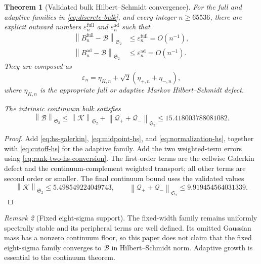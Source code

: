 \documentclass[11pt]{article}
\newtheorem{theorem}{Theorem}[section]
\theoremstyle{definition}
\theoremstyle{remark}
\newtheorem{remark}[theorem]{Remark}
\newcommand{\cK}{\mathcal K}
\newcommand{\cB}{\mathcal B}
\newcommand{\cQ}{\mathcal Q}
\newcommand{\norm}[1]{\left\lVert #1\right\rVert}
\begin{document}
\begin{theorem}[Validated bulk Hilbert--Schmidt convergence]
\label{thm:bulk-hs}
For the full and adaptive families in \eqref{eq:discrete-bulk}, and every
integer $n\ge65536$, there are explicit outward numbers
$\varepsilon_n^{\mathrm{full}}$ and
$\varepsilon_n^{\mathrm{ad}}$ such that
\begin{align}
 \norm{B_n^{\mathrm{full}}-\cB}_{\mathfrak S_2}
 &\le\varepsilon_n^{\mathrm{full}}=O(n^{-1}),
 \label{eq:full-hs-rate}\\
 \norm{B_n^{\mathrm{ad}}-\cB}_{\mathfrak S_2}
 &\le\varepsilon_n^{\mathrm{ad}}=O(n^{-1}).
 \label{eq:adaptive-hs-rate}
\end{align}
They are composed as
\begin{equation}
 \varepsilon_n
 =\eta_{K,n}+\sqrt2(\eta_{+,n}+\eta_{-,n}),
 \label{eq:bulk-ledger-composition}
\end{equation}
where $\eta_{K,n}$ is the appropriate full or adaptive Markov
Hilbert--Schmidt defect.

The intrinsic continuum bulk satisfies
\begin{equation}
 \norm{\cB}_{\mathfrak S_2}
 \le \norm{\cK}_{\mathfrak S_2}
     +\norm{\cQ_++\cQ_-}_{\mathfrak S_2}
 \le15.418003788081082.
 \label{eq:bulk-hs-upper}
\end{equation}
\end{theorem}

\begin{proof}
Add \eqref{eq:hs-galerkin}, \eqref{eq:midpoint-hs}, and
\eqref{eq:normalization-hs}, together with \eqref{eq:cutoff-hs} for the
adaptive family.  Add the two weighted-term errors using
\eqref{eq:rank-two-hs-conversion}.  The first-order terms are the cellwise
Galerkin defect and the continuum-complement weighted transport; all other
terms are second order or smaller.  The final continuum bound uses the
validated values
\[
 \norm{\cK}_{\mathfrak S_2}\le5.498549224049743,
 \qquad
 \norm{\cQ_++\cQ_-}_{\mathfrak S_2}
 \le9.919454564031339.
\]
\end{proof}

\begin{remark}[Fixed eight-sigma support]
The fixed-width family remains uniformly spectrally stable and its
peripheral terms are well defined.  Its omitted Gaussian mass has a
nonzero continuum floor, so this paper does not claim that the fixed
eight-sigma family converges to $\cB$ in Hilbert--Schmidt norm.  Adaptive
growth is essential to the continuum theorem.
\end{remark}
\end{document}
